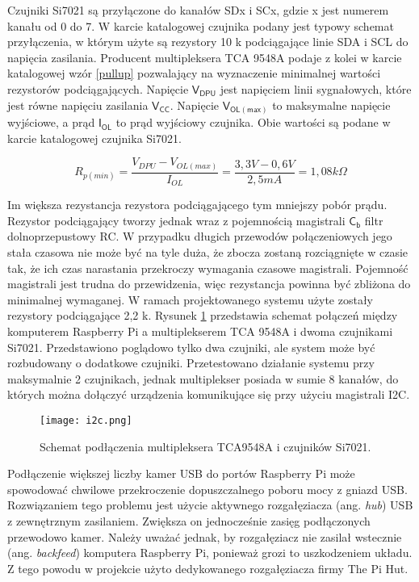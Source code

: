 \documentclass[a4paper,11pt,twoside]{article}
\begin{document}
Czujniki Si7021 są przyłączone do kanałów SDx i SCx, gdzie x jest numerem kanału od 0 do 7. W karcie katalogowej czujnika podany jest typowy schemat przyłączenia, w którym użyte są rezystory 10 k\textOmega\hspace{0.2em} podciągające  linie SDA i SCL do napięcia zasilania. Producent multipleksera TCA 9548A podaje z kolei w karcie katalogowej wzór \ref{pullup} pozwalający na wyznaczenie minimalnej wartości rezystorów podciągających.\cite{multiplekser} Napięcie $\mathsf{V_{DPU}}$ jest napięciem linii sygnałowych, które jest równe napięciu zasilania $\mathsf{V_{CC}}$. Napięcie $\mathsf{V_{OL(max)}}$ to maksymalne napięcie wyjściowe, a prąd $\mathsf{I_{OL}}$ to prąd wyjściowy czujnika. Obie wartości są podane w karcie katalogowej czujnika Si7021.\cite{czujnik_temp}

\begin{equation} \label{pullup}
R_{p(min)} = \frac{V_{DPU} - V_{OL(max)}}{I_{OL}} = \frac{3,3 V - 0,6 V}{2,5 mA} = 1,08 k\Omega  
\end{equation} 

Im większa rezystancja rezystora podciągającego tym mniejszy pobór prądu. Rezystor podciągający tworzy jednak wraz z pojemnością magistrali $\mathsf{C_{b}}$ filtr dolnoprzepustowy RC. W przypadku długich przewodów połączeniowych jego stała czasowa nie może być na tyle duża, że zbocza zostaną rozciągnięte w czasie tak, że ich czas narastania przekroczy wymagania czasowe magistrali. Pojemność magistrali jest trudna do przewidzenia, więc rezystancja powinna być zbliżona do minimalnej wymaganej. W ramach projektowanego systemu użyte zostały rezystory podciągające 2,2 k\textOmega. Rysunek \ref{fig: i2c_schemat} przedstawia schemat połączeń między komputerem Raspberry Pi a multiplekserem TCA 9548A i dwoma czujnikami Si7021. Przedstawiono poglądowo tylko dwa czujniki, ale system może być rozbudowany o dodatkowe czujniki. Przetestowano działanie systemu przy maksymalnie 2 czujnikach, jednak multiplekser posiada w sumie 8 kanałów, do których można dołączyć urządzenia komunikujące się przy użyciu magistrali I2C.

\begin{figure}[h]
\texttt{[image: i2c.png]}
\caption{Schemat podłączenia multipleksera TCA9548A i czujników Si7021.}
\label{fig: i2c_schemat}
\end{figure}

Podłączenie większej liczby kamer USB do portów Raspberry Pi może spowodować chwilowe przekroczenie dopuszczalnego poboru mocy z gniazd USB. Rozwiązaniem tego problemu jest użycie aktywnego rozgałęziacza (ang. \textit{hub}) USB z zewnętrznym zasilaniem. Zwiększa on jednocześnie zasięg podłączonych przewodowo kamer. Należy uważać jednak, by rozgałęziacz nie zasilał wstecznie (ang. \textit{backfeed}) komputera Raspberry Pi, ponieważ grozi to uszkodzeniem układu. Z tego powodu w projekcie użyto dedykowanego rozgałęziacza firmy The Pi Hut.
\end{document}
